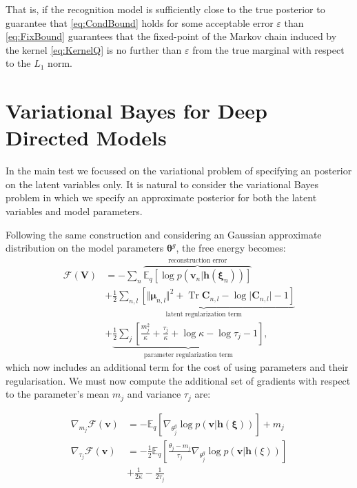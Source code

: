\documentclass{article}
\newcommand{\E}{\mathbb{E}} %
\newcommand{\FE}{\mathcal{F}} %
\DeclareMathOperator{\Tr}{Tr} %
\newcommand{\hid}{\ensuremath{\mathbf{h}}} %
\newcommand{\vis}{\ensuremath{\mathbf{v}}} %
\newcommand{\expect}[2]{\mathbb{E}_{#1}\left[#2\right]}
\newcommand{\myvec}[1]{\mbox{$\mathbf{#1}$}}
\newcommand{\myvecsym}[1]{\mbox{$\boldsymbol{#1}$}}
\newcommand{\vmu}{\mbox{$\myvecsym{\mu}$}}
\newcommand{\vtheta}{\mbox{$\myvecsym{\theta}$}}
\newcommand{\vxi}{\mbox{$\myvecsym{\xi}$}}
\newcommand{\vh}{\mbox{$\myvec{h}$}}
\newcommand{\vC}{\mbox{$\myvec{C}$}}
\newcommand{\vV}{\mbox{$\myvec{V}$}}
\begin{document}
\begin{bibunit}[icml2013]
That is, if the recognition model is sufficiently close to the true posterior 
to guarantee that \eqref{eq:CondBound} holds for some acceptable error 
$\varepsilon$ than \eqref{eq:FixBound} 
guarantees that the fixed-point of the Markov chain induced by the kernel
\eqref{eq:KernelQ} is no further than $\varepsilon$ from the true 
marginal with respect to the 
$L_1$ norm.

\section{Variational Bayes for Deep Directed Models}
In the main test we focussed on the variational problem of specifying an posterior on the latent variables only. It is natural to consider the variational Bayes problem in which we specify an approximate posterior for both the latent variables and model parameters.

Following the same construction and considering an Gaussian approximate distribution on the model parameters $\vtheta^g$, the free energy becomes:
\begin{align}
\FE(\vV)
&= -\sum_n
 \overbrace{\E_{q}{ \left[ \log p(\vis_n| \hid(\vxi_n) )   \right]  
}}^{\text{reconstruction error}} \nonumber 
\\
&+ \underbrace{\frac{1}{2} \sum_{n,l} \left[ \Vert \vmu_{n,l} \Vert ^2 + 
\Tr \vC _{n,l}  - \log \vert \vC_{n,l} \vert - 1 \right] }_{\text{latent 
regularization 
term}}\nonumber \\ 
&+\underbrace{\frac{1}{2}\sum_j \left[ \frac{m_j^2}{\kappa} + 
\frac{\tau_j}{\kappa} + \log \kappa - 
\log \tau_j - 1 \right]}_{\text{parameter regularization term}}, 
\label{eq:FE_VB}
\end{align}
which now includes an additional term for the cost of using parameters and their regularisation. We must now compute the additional set of gradients with respect to the parameter's mean $m_j$ 
and variance $\tau_j$ are:

\begin{align}
\nabla_{m_j} \FE(\vis) 
&= -\expect{q}{\nabla_{\theta_j^g} \log p(\vis | \vh(\vxi))} + m_j\\
\nabla_{\tau_j} \FE(\vis) 
&= - \tfrac{1}{2}\E_{q} \left[ \frac{\theta_j - m_j}{\tau_j} 
\nabla_{\theta_j^g} \log p(\vis| \hid(\xi) ) 
\right] \nonumber\\
&+ \frac{1}{2 \kappa} - \frac{1}{2 \tau_j} 
\label{eq:dFEdTau}
\end{align}



\end{bibunit}
\end{document}
